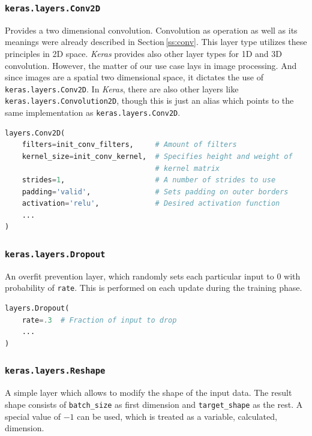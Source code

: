 \subsubsection{\texttt{keras.layers.Conv2D}}

Provides a two dimensional convolution. Convolution as operation as well as its meanings were already described in Section\,\ref{ss:conv}. This layer type utilizes these principles in 2D space. \textit{Keras} provides also other layer types for 1D and 3D convolution. However, the matter of our use case lays in image processing. And since images are a spatial two dimensional space, it dictates the use of \texttt{keras.layers.Conv2D}. In \textit{Keras}, there are also other layers like \texttt{keras.layers.Convolution2D}, though this is just an alias which points to the same implementation as \texttt{keras.layers.Conv2D}.

\begin{lstlisting}[language=Python, caption=2D convolution layer]
layers.Conv2D(
    filters=init_conv_filters,     # Amount of filters
    kernel_size=init_conv_kernel,  # Specifies height and weight of
                                   # kernel matrix
    strides=1,                     # A number of strides to use
    padding='valid',               # Sets padding on outer borders
    activation='relu',             # Desired activation function
    ...
)
\end{lstlisting}

\subsubsection{\texttt{keras.layers.Dropout}}

An overfit prevention layer, which randomly sets each particular input to 0 with probability of \texttt{rate}. This is performed on each update during the training phase.


\begin{lstlisting}[language=Python, caption=Dropout layer]
layers.Dropout(
    rate=.3  # Fraction of input to drop
    ...
)
\end{lstlisting}

\subsubsection{\texttt{keras.layers.Reshape}}

A simple layer which allows to modify the shape of the input data. The result shape consists of \texttt{batch\_size} as first dimension and \texttt{target\_shape} as the rest. A special value of $-1$ can be used, which is treated as a variable, calculated, dimension.

